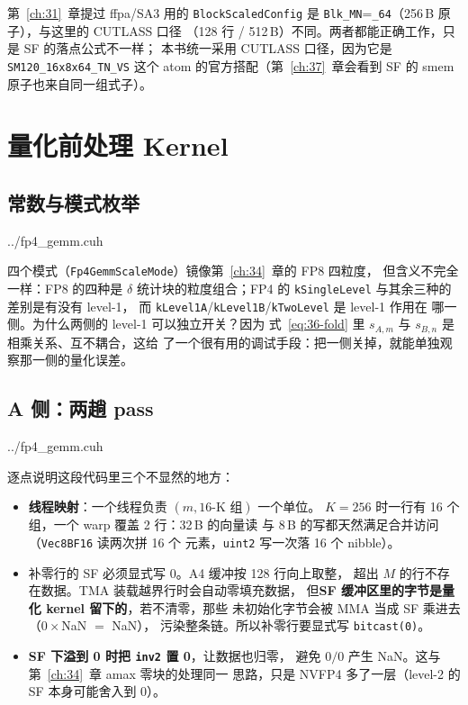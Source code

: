 第~\ref{ch:31}~章提过 ffpa/SA3 用的 \texttt{BlockScaledConfig} 是
\texttt{Blk\_MN}=\texttt{\_64}（256\,B 原子），与这里的 CUTLASS 口径
（128 行 / 512\,B）不同。两者都能正确工作，只是 SF 的落点公式不一样；
本书统一采用 CUTLASS 口径，因为它是 \texttt{SM120\_16x8x64\_TN\_VS} 这个
atom 的官方搭配（第~\ref{ch:37}~章会看到 SF 的 smem 原子也来自同一组式子）。

\section{量化前处理 Kernel}

\subsection{常数与模式枚举}

\begin{lstinputlisting}[linerange={61-93},firstnumber=auto,
  title={fp4\_gemm.cuh L61-93（量化常数、scale 模式、向量化 IO 单元）}]{../fp4_gemm.cuh}
\end{lstinputlisting}

四个模式（\texttt{Fp4GemmScaleMode}）镜像第~\ref{ch:34}~章的 FP8 四粒度，
但含义不完全一样：FP8 的四种是 $\delta$ 统计块的粒度组合；FP4 的
\texttt{kSingleLevel} 与其余三种的差别是有没有 level-1，
而 \texttt{kLevel1A}/\texttt{kLevel1B}/\texttt{kTwoLevel} 是 level-1 作用在
哪一侧。为什么两侧的 level-1 可以独立开关？因为
式~\ref{eq:36-fold} 里 $s_{A,m}$ 与 $s_{B,n}$ 是相乘关系、互不耦合，这给
了一个很有用的调试手段：把一侧关掉，就能单独观察那一侧的量化误差。

\subsection{A 侧：两趟 pass}

\begin{lstinputlisting}[linerange={153-233},firstnumber=auto,
  title={fp4\_gemm.cuh L153-233（行 amax pass + A 侧量化 kernel）}]{../fp4_gemm.cuh}
\end{lstinputlisting}

逐点说明这段代码里三个不显然的地方：

\begin{itemize}[itemsep=2pt,topsep=3pt]
  \item \textbf{线程映射}：一个线程负责 $(m, \text{16-K 组})$ 一个单位。
        $K{=}256$ 时一行有 16 个组，一个 warp 覆盖 2 行：32\,B 的向量读
        与 8\,B 的写都天然满足合并访问（\texttt{Vec8BF16} 读两次拼 16 个
        元素，\texttt{uint2} 写一次落 16 个 nibble）。
  \item 补零行的 SF 必须显式写 0。A4 缓冲按 128 行向上取整，
        超出 $M$ 的行不存在数据。TMA 装载越界行时会自动零填充数据，
        但\textbf{SF 缓冲区里的字节是量化 kernel 留下的}，若不清零，那些
        未初始化字节会被 MMA 当成 SF 乘进去（$0\times$NaN $=$ NaN），
        污染整条链。所以补零行要显式写 \texttt{bitcast(0)}。
  \item \textbf{SF 下溢到 0 时把 \texttt{inv2} 置 0}，让数据也归零，
        避免 $0/0$ 产生 NaN。这与第~\ref{ch:34}~章 amax 零块的处理同一
        思路，只是 NVFP4 多了一层（level-2 的 SF 本身可能舍入到 0）。
\end{itemize}

